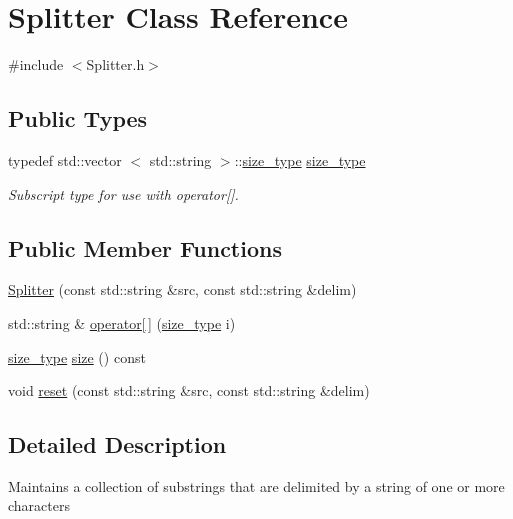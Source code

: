 \hypertarget{classSplitter}{\section{\-Splitter \-Class \-Reference}
\label{classSplitter}
}


{\ttfamily \#include $<$\-Splitter.\-h$>$}

\subsection*{\-Public \-Types}
\begin{DoxyCompactItemize}
\item 
\hypertarget{classSplitter_a24341275a00c0b617655258f5372a42c}{typedef std\-::vector\*
$<$ std\-::string $>$\-::\hyperlink{classSplitter_a24341275a00c0b617655258f5372a42c}{size\-\_\-type} \hyperlink{classSplitter_a24341275a00c0b617655258f5372a42c}{size\-\_\-type}}\label{classSplitter_a24341275a00c0b617655258f5372a42c}

\begin{DoxyCompactList}\small\item\em \-Subscript type for use with operator\mbox{[}\mbox{]}. \end{DoxyCompactList}\end{DoxyCompactItemize}
\subsection*{\-Public \-Member \-Functions}
\begin{DoxyCompactItemize}
\item 
\hyperlink{classSplitter_a41eddab681f5186c74c23c4e22666a36}{\-Splitter} (const std\-::string \&src, const std\-::string \&delim)
\item 
std\-::string \& \hyperlink{classSplitter_a2023627ffc281f4adc668251141715cc}{operator\mbox{[}$\,$\mbox{]}} (\hyperlink{classSplitter_a24341275a00c0b617655258f5372a42c}{size\-\_\-type} i)
\item 
\hyperlink{classSplitter_a24341275a00c0b617655258f5372a42c}{size\-\_\-type} \hyperlink{classSplitter_acc58917adcf1da6e6dbab05354a02276}{size} () const 
\item 
void \hyperlink{classSplitter_aadcb25576bce2a54423a17a63365848f}{reset} (const std\-::string \&src, const std\-::string \&delim)
\end{DoxyCompactItemize}


\subsection{\-Detailed \-Description}
\-Maintains a collection of substrings that are delimited by a string of one or more characters 

